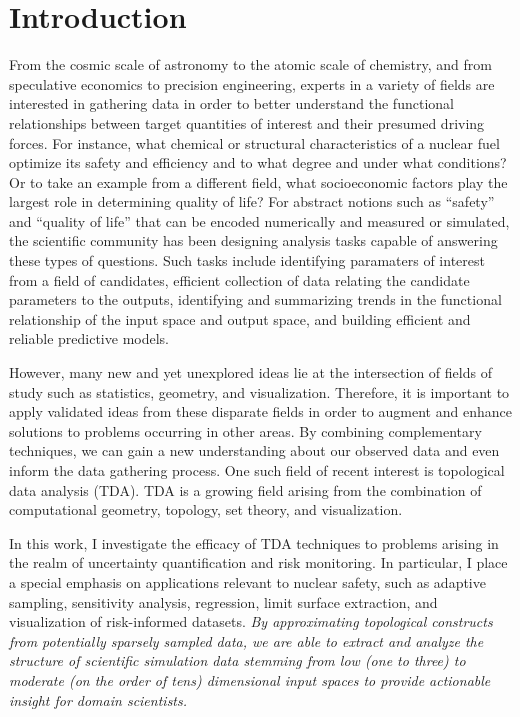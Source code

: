 
\chapter{Introduction}
\label{ch:introduction}
From the cosmic scale of astronomy to the atomic scale of chemistry, and from speculative economics to precision engineering, experts in a variety of fields are interested in gathering data in order to better understand the functional relationships between target quantities of interest and their presumed driving forces.
%
For instance, what chemical or structural characteristics of a nuclear fuel optimize its safety and efficiency and to what degree and under what conditions?
%
Or to take an example from a different field, what socioeconomic factors play the largest role in determining quality of life?
%
For abstract notions such as ``safety'' and ``quality of life'' that can be encoded numerically and measured or simulated, the scientific community has been designing analysis tasks capable of answering these types of questions.
%
Such tasks include identifying paramaters of interest from a field of candidates, efficient collection of data relating the candidate parameters to the outputs, identifying and summarizing trends in the functional relationship of the input space and output space, and building efficient and reliable predictive models.

However, many new and yet unexplored ideas lie at the intersection of fields of study such as statistics, geometry, and visualization.
%
Therefore, it is important to apply validated ideas from these disparate fields in order to augment and enhance solutions to problems occurring in other areas.
%
By combining complementary techniques, we can gain a new understanding about our observed data and even inform the data gathering process.
%
One such field of recent interest is topological data analysis (TDA).
%
TDA is a growing field arising from the combination of computational geometry, topology, set theory, and visualization.

In this work, I investigate the efficacy of TDA techniques to problems arising in the realm of uncertainty quantification and risk monitoring.
%
In particular, I place a special emphasis on applications relevant to nuclear safety, such as adaptive sampling, sensitivity analysis, regression, limit surface extraction, and visualization of risk-informed datasets.
%
\textit{By approximating topological constructs from potentially sparsely sampled data, we are able to extract and analyze the structure of scientific simulation data stemming from low (one to three) to moderate (on the order of tens) dimensional input spaces to provide actionable insight for domain scientists.}

